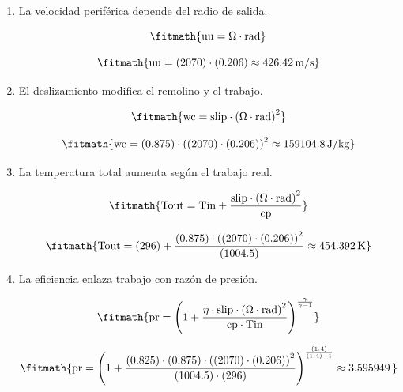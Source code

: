 \begin{enumerate}

\item La velocidad periférica depende del radio de salida.

\[\fitmath{\mathrm{uu}=\Omega\cdot \mathrm{rad}}\]

\[\fitmath{\mathrm{uu}=(2070)\cdot (0.206)\approx 426.42\,\mathrm{m/s}}\]

\item El deslizamiento modifica el remolino y el trabajo.

\[\fitmath{\mathrm{wc}=\mathrm{slip}\cdot {\left(\Omega\cdot \mathrm{rad}\right)}^{2}}\]

\[\fitmath{\mathrm{wc}=(0.875)\cdot {\left((2070)\cdot (0.206)\right)}^{2}\approx 159104.8\,\mathrm{J/kg}}\]

\item La temperatura total aumenta según el trabajo real.

\[\fitmath{\mathrm{Tout}=\mathrm{Tin}+\frac{\mathrm{slip}\cdot {\left(\Omega\cdot \mathrm{rad}\right)}^{2}}{\mathrm{cp}}}\]

\[\fitmath{\mathrm{Tout}=(296)+\frac{(0.875)\cdot {\left((2070)\cdot (0.206)\right)}^{2}}{(1004.5)}\approx 454.392\,\mathrm{K}}\]

\item La eficiencia enlaza trabajo con razón de presión.

\[\fitmath{\mathrm{pr}={\left(1+\frac{\eta\cdot \mathrm{slip}\cdot {\left(\Omega\cdot \mathrm{rad}\right)}^{2}}{\mathrm{cp}\cdot \mathrm{Tin}}\right)}^{\frac{\gamma}{\gamma-1}}}\]

\[\fitmath{\mathrm{pr}={\left(1+\frac{(0.825)\cdot (0.875)\cdot {\left((2070)\cdot (0.206)\right)}^{2}}{(1004.5)\cdot (296)}\right)}^{\frac{(1.4)}{(1.4)-1}}\approx 3.595949\,}\]

\end{enumerate}

